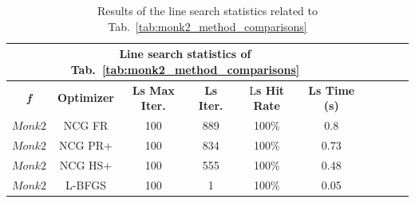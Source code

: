 \documentclass[11pt]{article}
\begin{document}
\begin{table}[H]
\small
    \centering
    \begin{tabular}{ |c|c|c|c|c|c|c|c|c|c|}
    \hline
     \multicolumn{6}{|c|}{\textbf{Line search statistics of Tab.~\ref{tab:monk2_method_comparisons}}} \\
      \hline
       \textbf{\textit{f}} & \textbf{Optimizer} & \textbf{Ls Max Iter.} &  \textbf{Ls Iter.} & L\textbf{s Hit Rate} & \textbf{Ls Time (s)}\\
     \hline
      $Monk2$ & NCG FR & 100 & 889 & 100\%  & 0.8  \\
      \hline
      $Monk2$ & NCG PR+ & 100 & 834 & 100\%  & 0.73\\
      \hline
      $Monk2$ & NCG HS+ & 100 & 555 & 100\%  & 0.48 \\
      \hline
      $Monk2$ & L-BFGS & 100 & 1 & 100\%  & 0.05 \\
      \hline
    \end{tabular}
    \caption{Results of the line search statistics related to Tab.~\ref{tab:monk2_method_comparisons}}
    \label{tab:monk2_method_comparisons_ls}
\end{table}
\end{document}

